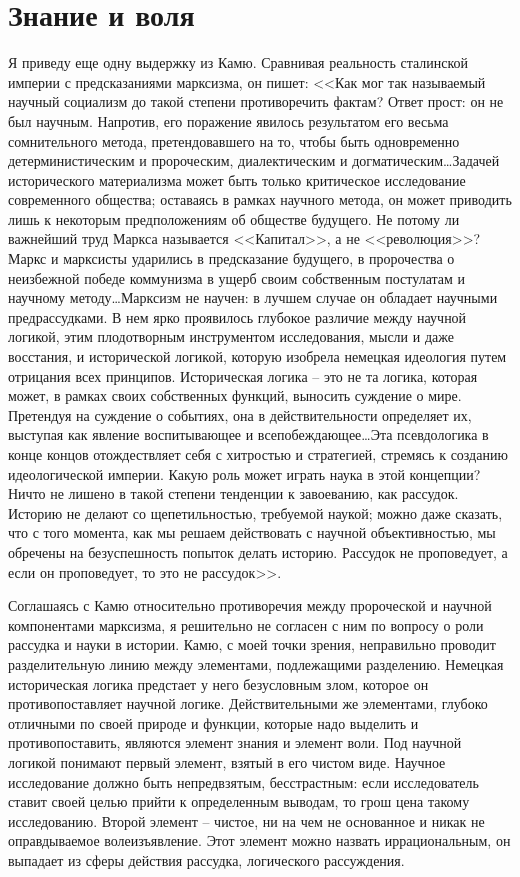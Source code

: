 \documentclass{book}
\begin{document}
\section{Знание и воля}

Я приведу еще одну выдержку из Камю. Сравнивая реальность сталинской империи с предсказаниями марксизма, он пишет:
<<Как мог так называемый научный социализм до такой степени противоречить фактам? Ответ прост: он не был научным. Напротив, его поражение явилось результатом его весьма сомнительного метода, претендовавшего на то, чтобы быть одновременно детерминистическим и пророческим, диалектическим и догматическим\ldots Задачей исторического материализма может быть только критическое исследование современного общества; оставаясь в рамках научного метода, он может приводить лишь к некоторым предположениям об обществе будущего. Не потому ли важнейший труд Маркса называется <<Капитал>>, а не <<революция>>? Маркс и марксисты ударились в предсказание будущего, в пророчества о неизбежной победе коммунизма в ущерб своим собственным постулатам и научному методу\ldots Марксизм не научен: в лучшем случае он обладает научными предрассудками. В нем ярко проявилось глубокое различие между научной логикой, этим плодотворным инструментом исследования, мысли и даже восстания, и исторической логикой, которую изобрела немецкая идеология 
путем отрицания всех принципов. Историческая логика -- это не та логика, которая может, в рамках своих собственных функций, выносить сужде­ние о мире. Претендуя на суждение о событиях, она в действи­тельности определяет их, выступая как явление воспитывающее и всепобеждающее\ldots Эта псевдологика в конце концов отождествляет себя с хитростью и стратегией, стремясь к созданию идеологической империи. Какую роль может играть наука в этой концепции? Ничто не лишено в такой степени тенденции к завоеванию, как рассудок. Историю не делают со щепетиль­ностью, требуемой наукой; можно даже сказать, что с того мо­мента, как мы решаем действовать с научной объективностью, мы обречены на безуспешность попыток делать историю. Рас­судок не проповедует, а если он проповедует, то это не рассу­док>>.%

Соглашаясь с Камю относительно противоречия между пророческой и научной компонентами марксизма, я решительно не согласен с ним по вопросу о роли рассудка и науки в истории. Камю, с моей точки зрения, неправильно проводит разделительную линию между элементами, подлежащими разделению. Немецкая историческая логика предстает у него безусловным злом, которое он противопоставляет научной логике. Действительными же элементами, глубоко отличными по своей природе и функции, которые надо выделить и противопоставить, являются элемент знания и элемент воли. Под научной логикой понимают первый элемент, взятый в его чистом виде. Научное исследование должно быть непредвзятым, бесстрастным: если исследователь ставит своей целью прийти к определенным выводам, то грош цена такому исследованию. Второй элемент -- чистое, ни на чем не основанное и никак не оправдываемое волеизъявление. Этот элемент можно назвать иррациональным, он выпадает из сферы действия рассудка, логического рассуждения.
\end{document}
